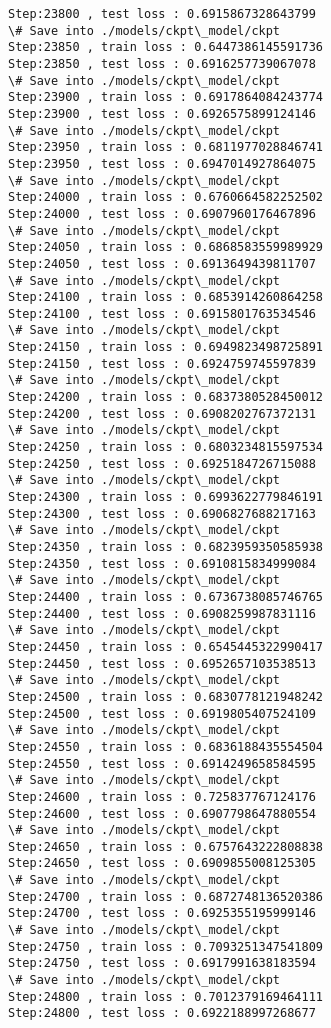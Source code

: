\documentclass[11pt]{article}
\begin{document}
\begin{Verbatim}[commandchars=\\\{\}]
Step:23800 , test loss : 0.6915867328643799
\# Save into ./models/ckpt\_model/ckpt
Step:23850 , train loss : 0.6447386145591736
Step:23850 , test loss : 0.6916257739067078
\# Save into ./models/ckpt\_model/ckpt
Step:23900 , train loss : 0.6917864084243774
Step:23900 , test loss : 0.6926575899124146
\# Save into ./models/ckpt\_model/ckpt
Step:23950 , train loss : 0.6811977028846741
Step:23950 , test loss : 0.6947014927864075
\# Save into ./models/ckpt\_model/ckpt
Step:24000 , train loss : 0.6760664582252502
Step:24000 , test loss : 0.6907960176467896
\# Save into ./models/ckpt\_model/ckpt
Step:24050 , train loss : 0.6868583559989929
Step:24050 , test loss : 0.6913649439811707
\# Save into ./models/ckpt\_model/ckpt
Step:24100 , train loss : 0.6853914260864258
Step:24100 , test loss : 0.6915801763534546
\# Save into ./models/ckpt\_model/ckpt
Step:24150 , train loss : 0.6949823498725891
Step:24150 , test loss : 0.6924759745597839
\# Save into ./models/ckpt\_model/ckpt
Step:24200 , train loss : 0.6837380528450012
Step:24200 , test loss : 0.6908202767372131
\# Save into ./models/ckpt\_model/ckpt
Step:24250 , train loss : 0.6803234815597534
Step:24250 , test loss : 0.6925184726715088
\# Save into ./models/ckpt\_model/ckpt
Step:24300 , train loss : 0.6993622779846191
Step:24300 , test loss : 0.6906827688217163
\# Save into ./models/ckpt\_model/ckpt
Step:24350 , train loss : 0.6823959350585938
Step:24350 , test loss : 0.6910815834999084
\# Save into ./models/ckpt\_model/ckpt
Step:24400 , train loss : 0.6736738085746765
Step:24400 , test loss : 0.6908259987831116
\# Save into ./models/ckpt\_model/ckpt
Step:24450 , train loss : 0.6545445322990417
Step:24450 , test loss : 0.6952657103538513
\# Save into ./models/ckpt\_model/ckpt
Step:24500 , train loss : 0.6830778121948242
Step:24500 , test loss : 0.6919805407524109
\# Save into ./models/ckpt\_model/ckpt
Step:24550 , train loss : 0.6836188435554504
Step:24550 , test loss : 0.6914249658584595
\# Save into ./models/ckpt\_model/ckpt
Step:24600 , train loss : 0.725837767124176
Step:24600 , test loss : 0.6907798647880554
\# Save into ./models/ckpt\_model/ckpt
Step:24650 , train loss : 0.6757643222808838
Step:24650 , test loss : 0.6909855008125305
\# Save into ./models/ckpt\_model/ckpt
Step:24700 , train loss : 0.6872748136520386
Step:24700 , test loss : 0.6925355195999146
\# Save into ./models/ckpt\_model/ckpt
Step:24750 , train loss : 0.7093251347541809
Step:24750 , test loss : 0.6917991638183594
\# Save into ./models/ckpt\_model/ckpt
Step:24800 , train loss : 0.7012379169464111
Step:24800 , test loss : 0.6922188997268677

\end{Verbatim}
\end{document}
